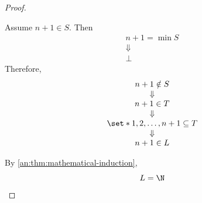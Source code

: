 \begin{proof}
\begin{itemize}
\[          \]
          Assume $n + 1 \in S$. Then
          \[
            \begin{array}{c}
              n + 1 = \min S \\
              \Downarrow     \\
              \bot
            \end{array}
          \]
          Therefore,
          \[
            \begin{array}{c}
              n + 1 \notin S                        \\
              \Downarrow                            \\
              n + 1 \in T                           \\
              \Downarrow                            \\
              \set*{1, 2, \dots, n + 1} \subseteq T \\
              \Downarrow                            \\
              n + 1 \in L
            \end{array}
          \]
  \end{itemize}
  By \cref{an:thm:mathematical-induction},
  \[
    L = \N
  \]
\end{proof}
